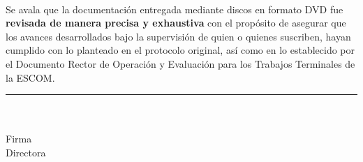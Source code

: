 \begin{center}
  \TTparticipanteA\\
  \TTparticipanteB
\end{center}

\noindent Se avala que la documentación entregada mediante discos en formato
DVD fue \textbf{revisada de manera precisa y exhaustiva} con el propósito de
asegurar que los avances desarrollados bajo la supervisión de quien o quienes
suscriben, hayan cumplido con lo planteado en el protocolo original, así como
en lo establecido por el Documento Rector de Operación y Evaluación para los
Trabajos Terminales de la ESCOM.

\vspace{0.8cm}

\vspace{2.2cm}
\begin{center}
  \begin{minipage}{0.45\linewidth}
    \centering
    \rule{\linewidth}{0.6pt}\\
    \TTdirectora\\
    Firma\\
    Directora
  \end{minipage}
\end{center}
\clearpage
